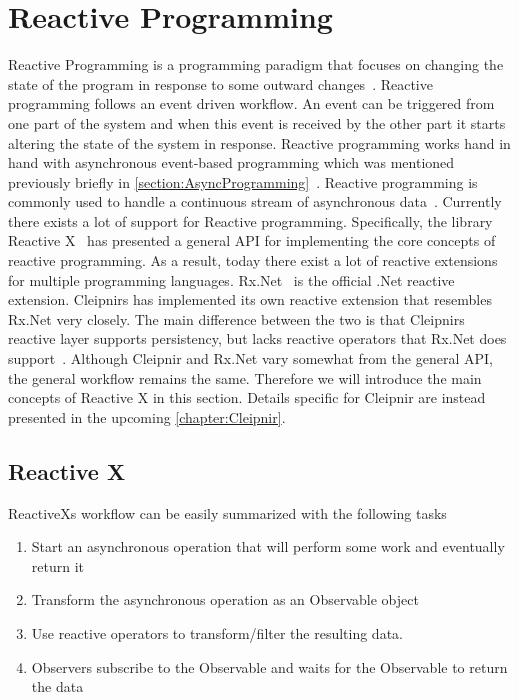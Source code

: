 \section{Reactive Programming}
\label{section:reactive}
Reactive Programming is a programming paradigm that focuses on changing the state of the program in response to some outward changes~\cite{WEB:RxProgIntro, DOC:Cleipnir}.
Reactive programming follows an event driven workflow. An event can be triggered from one part of the system and when this event is received by the other part it starts altering the state of the system in response. Reactive programming works hand in hand with asynchronous event-based programming which was mentioned previously briefly in \autoref{section:AsyncProgramming}~\cite[p.~2-3]{BOOK:RxLinq}. Reactive programming is commonly used to handle a continuous stream of asynchronous data~\cite{VIDEO:dotnetsheffReactive}. 
Currently there exists a lot of support for Reactive programming. Specifically, the library Reactive X~\cite{WEB:ReactiveXMainPage} has presented a general API for implementing the core concepts of reactive programming. As a result, today there exist a lot of reactive extensions for multiple programming languages. Rx.Net~\cite{Github:ReactiveExtensions} is the official .Net reactive extension. Cleipnirs has implemented its own reactive extension that resembles Rx.Net very closely. The main difference between the two is that Cleipnirs reactive layer supports persistency, but lacks reactive operators that Rx.Net does support~\cite{DOC:Cleipnir}.
Although Cleipnir and Rx.Net vary somewhat from the general API, the general workflow remains the same. Therefore we will introduce the main concepts of Reactive X in this section. Details specific for Cleipnir are instead presented in the upcoming \autoref{chapter:Cleipnir}.

\subsection{Reactive X}
ReactiveXs workflow can be easily summarized with the following tasks~\cite{WEB:ReactiveObservable}
\begin{enumerate}
	\item{Start an asynchronous operation that will perform some work and eventually return it}
	\item{Transform the asynchronous operation as an Observable object}
	\item{Use reactive operators to transform/filter the resulting data.}
	\item{Observers subscribe to the Observable and waits for the Observable to return the data}
\end{enumerate}


